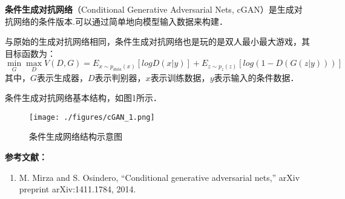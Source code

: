 
\textbf{条件生成对抗网络}（Conditional Generative Adversarial Nets, cGAN）是生成对抗网络的条件版本.可以通过简单地向模型输入数据来构建．

与原始的生成对抗网络相同，条件生成对抗网络也是玩的是双人最小最大游戏，其目标函数为：
\begin{equation}
\mathop{\min}\limits_G \mathop {\max }\limits_D V(D,G)=E_{x\sim p_{data}(x)}[logD(x|y)]+E_{z\sim p_z(z)}[log(1-D(G(z|y)))]
\end{equation}
其中，$G$表示生成器，$D$表示判别器，$x$表示训练数据，$y$表示输入的条件数据．

条件生成对抗网络基本结构，如图1所示．
\begin{figure}[ht]
\centering
\texttt{[image: ./figures/cGAN\_1.png]}
\caption{条件生成网络结构示意图} \label{cGAN_fig1}
\end{figure}



\textbf{参考文献：}
\begin{enumerate}
\item M. Mirza and S. Osindero, “Conditional generative adversarial nets,” arXiv preprint arXiv:1411.1784, 2014.
\end{enumerate}